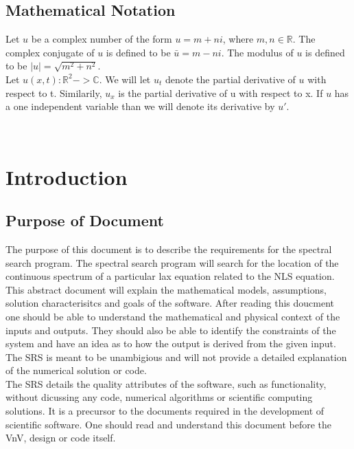 \documentclass[12pt]{article}
\begin{document}
\subsection{Mathematical Notation}
Let $u$ be a complex number of the form $u= m + ni$, where $m,n \in 
\mathbb{R}$. The complex conjugate of $u$ is defined to be $\bar{u}= m - ni$. 
The modulus of $u$ is defined to be $|u| = \sqrt{m^{2}+n^{2}}$. \\

Let $u(x,t): \mathbb{R}^{2} -> \mathbb{C}$. We will let $u_{t}$ denote the 
partial derivative of $u$ with respect to t. Similarily, $u_{x}$ is the partial 
derivative of u with respect to x. If $u$ has a one independent variable than 
we will denote its derivative by $u'$. \\


\newpage

\tableofcontents

~\newpage


\section{Introduction}

\subsection{Purpose of Document}
The purpose of this document is to describe the requirements for the spectral 
search program. The spectral search program will search for the location of the 
continuous spectrum of a particular lax equation related to the NLS equation. 
This abstract document will explain the mathematical models, assumptions, 
solution characterisitcs and goals of the software. After reading this doucment 
one should be able to understand the mathematical and physical context of the 
inputs and outputs. They should also be able to identify the constraints of the 
system and have an idea as to how the output is derived from the given input.  
The SRS is meant to be unambigious and will not provide a detailed explanation 
of the numerical solution or code. \\
The SRS details the quality attributes of the software, such as functionality, 
without dicussing any code, numerical algorithms or scientific computing 
solutions. It is a precursor to the documents required in the development of 
scientific software. One should read and understand this document before the 
VnV, design or code itself. \\
\end{document}
